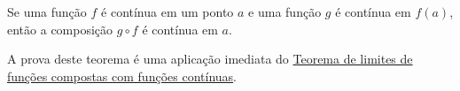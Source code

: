 \begin{theorem}
Se uma função $f$ é contínua em um ponto $a$ e uma função $g$ é contínua em $f(a)$, então a composição $g\circ f$ é contínua em $a$.
\end{theorem}

A prova deste teorema é uma aplicação imediata do \href{teo_lim_comp_moodle.html}{Teorema de limites de funções compostas com funções contínuas}.